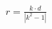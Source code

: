 \documentclass[preview]{standalone}
\begin{document}
\begin{align*}
r = \frac{k \cdot d}{|k^2 - 1|}
\end{align*}
\end{document}

